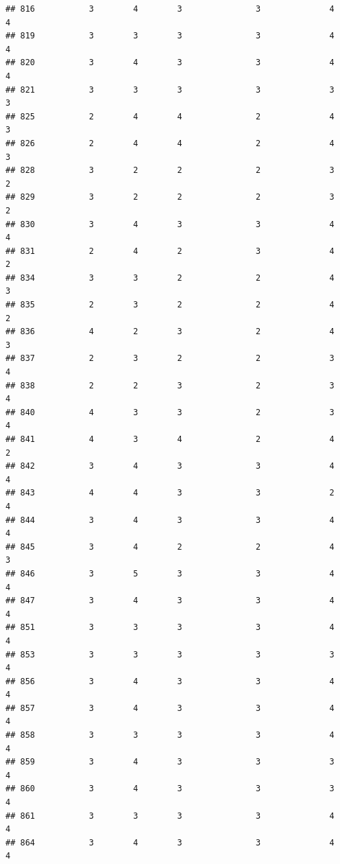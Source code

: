 \documentclass[
]{article}
\begin{document}
\begin{verbatim}
## 816           3        4        3               3              4             4
## 819           3        3        3               3              4             4
## 820           3        4        3               3              4             4
## 821           3        3        3               3              3             3
## 825           2        4        4               2              4             3
## 826           2        4        4               2              4             3
## 828           3        2        2               2              3             2
## 829           3        2        2               2              3             2
## 830           3        4        3               3              4             4
## 831           2        4        2               3              4             2
## 834           3        3        2               2              4             3
## 835           2        3        2               2              4             2
## 836           4        2        3               2              4             3
## 837           2        3        2               2              3             4
## 838           2        2        3               2              3             4
## 840           4        3        3               2              3             4
## 841           4        3        4               2              4             2
## 842           3        4        3               3              4             4
## 843           4        4        3               3              2             4
## 844           3        4        3               3              4             4
## 845           3        4        2               2              4             3
## 846           3        5        3               3              4             4
## 847           3        4        3               3              4             4
## 851           3        3        3               3              4             4
## 853           3        3        3               3              3             4
## 856           3        4        3               3              4             4
## 857           3        4        3               3              4             4
## 858           3        3        3               3              4             4
## 859           3        4        3               3              3             4
## 860           3        4        3               3              3             4
## 861           3        3        3               3              4             4
## 864           3        4        3               3              4             4

\end{verbatim}
\end{document}
